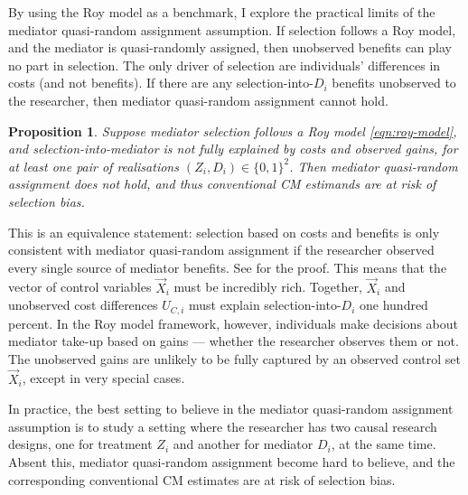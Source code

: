 By using the Roy model as a benchmark, I explore the practical limits of the mediator quasi-random assignment assumption.
If selection follows a Roy model, and the mediator is quasi-randomly assigned, then unobserved benefits can play no part in selection.
The only driver of selection are individuals' differences in costs (and not benefits).
If there are any selection-into-$D_i$ benefits unobserved to the researcher, then mediator quasi-random assignment cannot hold.
\newtheorem{proposition}{Proposition}
\begin{proposition}
    \label{prop:roy-seq-ig}
    Suppose mediator selection follows a Roy model \eqref{eqn:roy-model}, and selection-into-mediator is not fully explained by costs and observed gains, for at least one pair of realisations $(Z_i, D_i) \in \{0,1\}^2$.
    Then mediator quasi-random assignment does not hold, and thus conventional CM estimands are at risk of selection bias.
\end{proposition}

This is an equivalence statement: selection based on costs and benefits is only consistent with mediator quasi-random assignment if the researcher observed every single source of mediator benefits.
See  for the proof.
This means that the vector of control variables $\vec X_i$ must be incredibly rich.
Together, $\vec X_i$ and unobserved cost differences $U_{C,i}$ must explain selection-into-$D_i$ one hundred percent.
In the Roy model framework, however, individuals make decisions about mediator take-up based on gains --- whether the researcher observes them or not.
The unobserved gains are unlikely to be fully captured by an observed control set $\vec X_i$, except in very special cases.

In practice, the best setting to believe in the mediator quasi-random assignment assumption is to study a setting where the researcher has two causal research designs, one for treatment $Z_i$ and another for mediator $D_i$, at the same time.
Absent this, mediator quasi-random assignment become hard to believe, and the corresponding conventional CM estimates are at risk of selection bias.

% 
% 
% 
